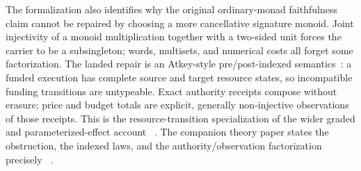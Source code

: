 \documentclass[11pt]{article}
\begin{document}
The formalization also identifies why the original ordinary-monad faithfulness claim cannot
be repaired by choosing a more cancellative signature monoid.  Joint injectivity of a monoid
multiplication together with a two-sided unit forces the carrier to be a subsingleton; words,
multisets, and numerical costs all forget some factorization.  The landed repair is an
Atkey-style pre/post-indexed semantics~\cite{atkey}: a funded execution has complete source
and target resource states, so incompatible funding transitions are untypeable.  Exact
authority receipts compose without erasure; price and budget totals are explicit,
generally non-injective observations of those receipts.  This is the resource-transition
specialization of the wider graded and parameterized-effect account
~\cite{katsumata,orchard-wadler-eades}.  The companion theory paper states the obstruction,
the indexed laws, and the authority/observation factorization precisely
~\cite{rhocost-companion}.
\end{document}
